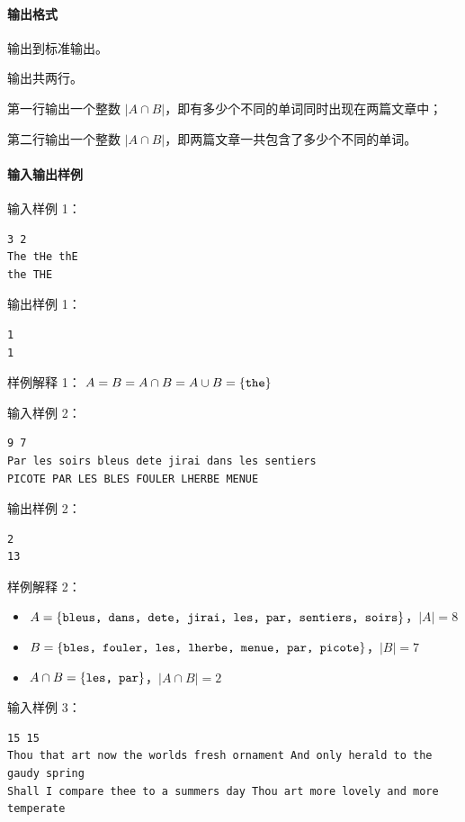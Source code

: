 \documentclass[UTF8]{ctexart}
\begin{document}
{\paragraph{输出格式}
输出到标准输出。

输出共两行。

第一行输出一个整数 $|A\cap B|$，即有多少个不同的单词同时出现在两篇文章中；

第二行输出一个整数 $|A\cap B|$，即两篇文章一共包含了多少个不同的单词。

\paragraph{输入输出样例}

输入样例 1：
\begin{lstlisting}[numbers=none]
3 2
The tHe thE
the THE
\end{lstlisting}

输出样例 1：
\begin{lstlisting}[numbers=none]
1
1
\end{lstlisting}

样例解释 1：
$A = B = A\cap B = A\cup B = \{\text{\texttt{the}}\}$

输入样例 2：
\begin{lstlisting}[numbers=none]
9 7
Par les soirs bleus dete jirai dans les sentiers
PICOTE PAR LES BLES FOULER LHERBE MENUE
\end{lstlisting}

输出样例 2：
\begin{lstlisting}[numbers=none]
2
13
\end{lstlisting}

样例解释 2：
\begin{itemize}[itemsep=0pt,parsep=0pt]
    \item $A = \{\text{\texttt{bleus, dans, dete, jirai, les, par, sentiers, soirs}}\}$，$|A|=8$

    \item $B = \{\text{\texttt{bles, fouler, les, lherbe, menue, par, picote}}\}$，$|B|=7$

    \item $A\cap B = \{\text{\texttt{les, par}}\}$，$|A\cap B|=2$
\end{itemize}


输入样例 3：
\begin{lstlisting}[numbers=none, basicstyle=\footnotesize\ttfamily]
15 15
Thou that art now the worlds fresh ornament And only herald to the gaudy spring
Shall I compare thee to a summers day Thou art more lovely and more temperate
\end{lstlisting}

}
\end{document}
